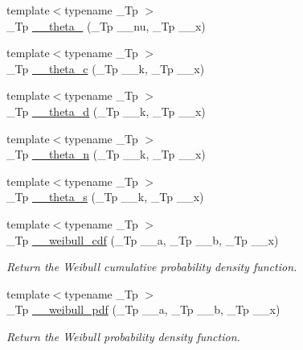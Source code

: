 \begin{DoxyCompactItemize}
\item 
{\footnotesize template$<$typename \+\_\+\+Tp $>$ }\\\+\_\+\+Tp \hyperlink{namespacestd_1_1____detail_a274d3801b84bcaad13c274c8bab32bcc}{\+\_\+\+\_\+theta\+\_} (\+\_\+\+Tp \+\_\+\+\_\+nu, \+\_\+\+Tp \+\_\+\+\_\+x)
\item 
{\footnotesize template$<$typename \+\_\+\+Tp $>$ }\\\+\_\+\+Tp \hyperlink{namespacestd_1_1____detail_af95cdf16bfcf6c138d621b0c518a3299}{\+\_\+\+\_\+theta\+\_\+c} (\+\_\+\+Tp \+\_\+\+\_\+k, \+\_\+\+Tp \+\_\+\+\_\+x)
\item 
{\footnotesize template$<$typename \+\_\+\+Tp $>$ }\\\+\_\+\+Tp \hyperlink{namespacestd_1_1____detail_ad4ca29063a2f624e185592497d37a670}{\+\_\+\+\_\+theta\+\_\+d} (\+\_\+\+Tp \+\_\+\+\_\+k, \+\_\+\+Tp \+\_\+\+\_\+x)
\item 
{\footnotesize template$<$typename \+\_\+\+Tp $>$ }\\\+\_\+\+Tp \hyperlink{namespacestd_1_1____detail_aace76210c8f70761bb14ab602b88d027}{\+\_\+\+\_\+theta\+\_\+n} (\+\_\+\+Tp \+\_\+\+\_\+k, \+\_\+\+Tp \+\_\+\+\_\+x)
\item 
{\footnotesize template$<$typename \+\_\+\+Tp $>$ }\\\+\_\+\+Tp \hyperlink{namespacestd_1_1____detail_aeac5da2d394fafe6432871abf5c05413}{\+\_\+\+\_\+theta\+\_\+s} (\+\_\+\+Tp \+\_\+\+\_\+k, \+\_\+\+Tp \+\_\+\+\_\+x)
\item 
{\footnotesize template$<$typename \+\_\+\+Tp $>$ }\\\+\_\+\+Tp \hyperlink{namespacestd_1_1____detail_aeb9a99b7ca44c9e403f78baf38dc293b}{\+\_\+\+\_\+weibull\+\_\+cdf} (\+\_\+\+Tp \+\_\+\+\_\+a, \+\_\+\+Tp \+\_\+\+\_\+b, \+\_\+\+Tp \+\_\+\+\_\+x)
\begin{DoxyCompactList}\small\item\em Return the Weibull cumulative probability density function. \end{DoxyCompactList}\item 
{\footnotesize template$<$typename \+\_\+\+Tp $>$ }\\\+\_\+\+Tp \hyperlink{namespacestd_1_1____detail_ab15a21521bc750303938a108c5a0bb0b}{\+\_\+\+\_\+weibull\+\_\+pdf} (\+\_\+\+Tp \+\_\+\+\_\+a, \+\_\+\+Tp \+\_\+\+\_\+b, \+\_\+\+Tp \+\_\+\+\_\+x)
\begin{DoxyCompactList}\small\item\em Return the Weibull probability density function. \end{DoxyCompactList}\item 

\end{DoxyCompactItemize}
